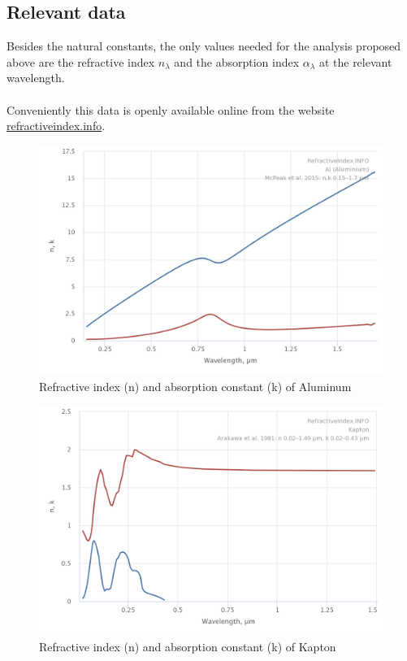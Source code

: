 \documentclass[14pt]{article}
\begin{document}
\subsection{Relevant data}

Besides the natural constants, the only values needed for the analysis proposed above are the refractive index $n_{\lambda}$
and the absorption index $\alpha_{\lambda}$ at the relevant wavelength.\\
\\
Conveniently this data is openly available online from the website \hyperref{https://refractiveindex.info}{}{}{refractiveindex.info}\autocite{polyanskiy}.\\

\begin{figure}[H]
  \includegraphics[width=14cm]{./resources/RefractiveIndexAl.png}
  \caption{Refractive index (n) and absorption constant (k) of Aluminum}
  \label{fig:complex_refraction_aliminum}
\end{figure}

\begin{figure}[H]
  \includegraphics[width=14cm]{./resources/RefractiveIndexKapton.png}
  \caption{Refractive index (n) and absorption constant (k) of Kapton}
  \label{fig:complex_refraction_kapton}
\end{figure}
\end{document}
